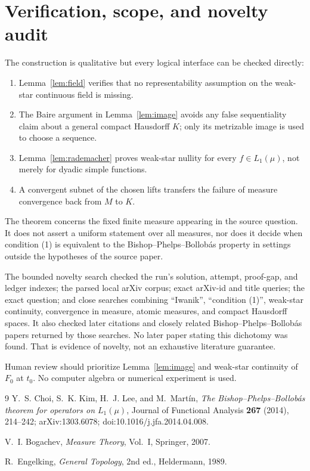\documentclass[11pt]{article}
\begin{document}
\section{Verification, scope, and novelty audit}

The construction is qualitative but every logical interface can be checked
directly:
\begin{enumerate}
\item Lemma~\ref{lem:field} verifies that no representability assumption on
      the weak-star continuous field is missing.
\item The Baire argument in Lemma~\ref{lem:image} avoids any false
      sequentiality claim about a general compact Hausdorff $K$; only its
      metrizable image is used to choose a sequence.
\item Lemma~\ref{lem:rademacher} proves weak-star nullity for every
      $f\in L_1(\mu)$, not merely for dyadic simple functions.
\item A convergent subnet of the chosen lifts transfers the failure of
      measure convergence back from $M$ to $K$.
\end{enumerate}

The theorem concerns the fixed finite measure appearing in the source
question.  It does not assert a uniform statement over all measures, nor
does it decide when condition (1) is equivalent to the Bishop--Phelps--Bollob\'as
property in settings outside the hypotheses of the source paper.

The bounded novelty search checked the run's solution, attempt, proof-gap,
and ledger indexes; the parsed local arXiv corpus; exact arXiv-id and title
queries; the exact question; and close searches combining ``Iwanik'',
``condition (1)'', weak-star continuity, convergence in measure, atomic
measures, and compact Hausdorff spaces.  It also checked later citations and
closely related Bishop--Phelps--Bollob\'as papers returned by those searches.
No later paper stating this dichotomy was found.  That is evidence of
novelty, not an exhaustive literature guarantee.

Human review should prioritize Lemma~\ref{lem:image} and weak-star
continuity of $F_0$ at $t_0$.  No computer algebra or numerical experiment is
used.

\begin{thebibliography}{9}
Y.~S. Choi, S.~K. Kim, H.~J. Lee, and M.~Mart\'in,
\emph{The Bishop--Phelps--Bollob\'as theorem for operators on $L_1(\mu)$},
Journal of Functional Analysis \textbf{267} (2014), 214--242;
arXiv:1303.6078; doi:10.1016/j.jfa.2014.04.008.

V.~I. Bogachev, \emph{Measure Theory}, Vol.~I, Springer, 2007.

R.~Engelking, \emph{General Topology}, 2nd ed., Heldermann, 1989.
\end{thebibliography}
\end{document}
